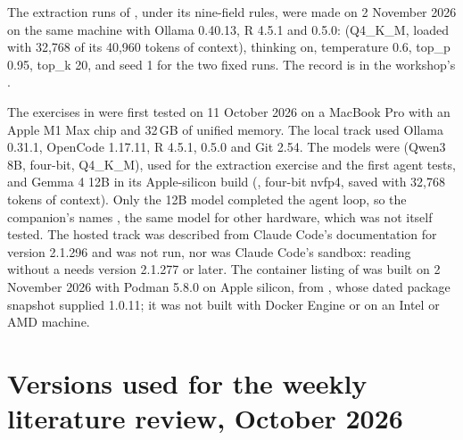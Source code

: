 The extraction runs of , under its nine-field rules, were
made on 2 November 2026 on the same machine with Ollama 0.40.13, R 4.5.1 and
 0.5.0:  (Q4\_K\_M, loaded with 32,768 of its
40,960 tokens of context), thinking on, temperature 0.6, top\_p 0.95, top\_k
20, and seed 1 for the two fixed runs. The record is in the workshop's
.

The exercises in  were first tested on
11 October 2026 on a MacBook Pro with an Apple M1 Max chip and 32\,GB of
unified memory. The local track used Ollama 0.31.1, OpenCode 1.17.11, R 4.5.1,
 0.5.0 and Git 2.54. The models were  (Qwen3 8B,
four-bit, Q4\_K\_M), used for the extraction exercise and the first agent
tests, and Gemma 4 12B in its Apple-silicon build (,
four-bit nvfp4, saved with 32,768 tokens of context). Only the 12B model
completed the agent loop, so the companion's
 names , the same model for other
hardware, which was not itself tested. The hosted track was described from Claude
Code's documentation for version 2.1.296 and was not run, nor was Claude
Code's sandbox: reading  without a  needs
version 2.1.277 or later. The container listing of 
was built on 2 November 2026 with Podman 5.8.0 on Apple silicon, from
, whose dated package snapshot supplied
 1.0.11; it was not built with Docker Engine or on an Intel or AMD
machine.

\section{Versions used for the weekly literature review, October 2026}

